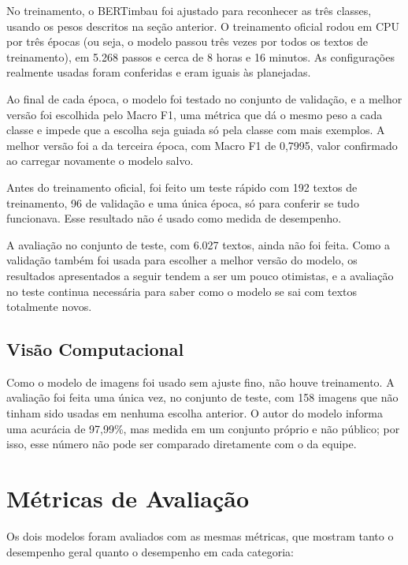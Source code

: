 \documentclass[
    12pt,           %
    oneside,        %
    a4paper,        %
    chapter=TITLE,  %
    english,        %
    brazil          %
]{abntex2}
\begin{document}
No treinamento, o BERTimbau foi ajustado para reconhecer as três classes,
usando os pesos descritos na seção anterior. O treinamento oficial rodou em
CPU por três épocas (ou seja, o modelo passou três vezes por todos os textos
de treinamento), em 5.268 passos e cerca de 8 horas e 16 minutos. As
configurações realmente usadas foram conferidas e eram iguais às planejadas.

Ao final de cada época, o modelo foi testado no conjunto de validação, e a
melhor versão foi escolhida pelo Macro F1, uma métrica que dá o mesmo peso a
cada classe e impede que a escolha seja guiada só pela classe com mais
exemplos. A melhor versão foi a da terceira época, com Macro F1 de 0,7995,
valor confirmado ao carregar novamente o modelo salvo.

Antes do treinamento oficial, foi feito um teste rápido com 192 textos de
treinamento, 96 de validação e uma única época, só para conferir se tudo
funcionava. Esse resultado não é usado como medida de desempenho.

A avaliação no conjunto de teste, com 6.027 textos, ainda não foi feita. Como
a validação também foi usada para escolher a melhor versão do modelo, os
resultados apresentados a seguir tendem a ser um pouco otimistas, e a
avaliação no teste continua necessária para saber como o modelo se sai com
textos totalmente novos.
\subsection{Visão Computacional}

Como o modelo de imagens foi usado sem ajuste fino, não houve treinamento. A
avaliação foi feita uma única vez, no conjunto de teste, com 158 imagens que
não tinham sido usadas em nenhuma escolha anterior. O autor do modelo
informa uma acurácia de 97,99\%, mas medida em um conjunto próprio e não
público; por isso, esse número não pode ser comparado diretamente com o da
equipe.
\section{Métricas de Avaliação}

Os dois modelos foram avaliados com as mesmas métricas, que mostram tanto o
desempenho geral quanto o desempenho em cada categoria:
\end{document}
